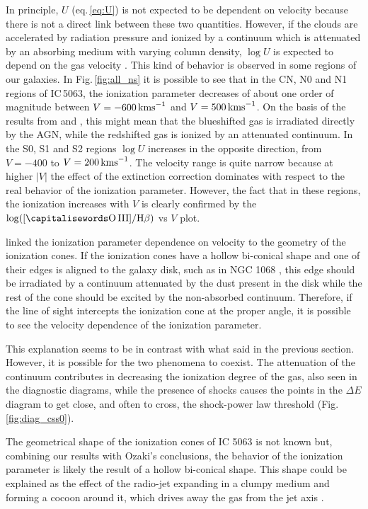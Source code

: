 \documentclass[../main.tex]{subfiles}
\begin{document}
In principle, $U$ (eq.\,\ref{eq:U}) is not expected to be dependent on velocity because there is not a direct link between these two quantities.
However, if the clouds are accelerated by radiation pressure and ionized by a continuum which is attenuated by an absorbing medium with varying column density, $\log U$ is expected to depend on the gas velocity \citep{Ozaki09}.
This kind of behavior is observed in some regions of our galaxies.
In Fig.\,\ref{fig:all_ns} it is possible to see that in the CN, N0 and N1 regions of IC\,5063, the ionization parameter decreases of about one order of magnitude between $V=-600\,\si{\kms}$ and $V=500\,\si{\kms}$.
On the basis of the results from \citet{Kraemer00} and \citet{Ozaki09}, this might mean that the blueshifted gas is irradiated directly by the AGN, while the redshifted gas is ionized by an attenuated continuum.
In the S0, S1 and S2 regions $\log U$ increases in the opposite direction, from $V=-400$ to $V=200\,\si{\kms}$.
The velocity range is quite narrow because at higher $\lvert V \rvert$ the effect of the extinction correction dominates with respect to the real behavior of the ionization parameter.
However, the fact that in these regions, the ionization increases with $V$ is clearly confirmed by the $\log([\rm\ion{O}{III}]/\Hb)$ vs $V$ plot.

\citet{Ozaki09} linked  the ionization parameter dependence on velocity to the geometry of the ionization cones.
If the ionization cones have a hollow bi-conical shape and one of their edges is aligned to the galaxy disk, such as in NGC 1068 \citep{Cecil02, Das06}, this edge should be irradiated by a continuum attenuated by the dust present in the disk while the rest of the cone should be excited by the non-absorbed continuum.
Therefore, if the line of sight intercepts the ionization cone at the proper angle, it is possible to see the velocity dependence of the ionization parameter.

This explanation seems to be in contrast with what said in the previous section.
However, it is possible for the two phenomena to coexist. 
The attenuation of the continuum contributes in decreasing the ionization degree of the gas, also seen in the diagnostic diagrams, while the presence of shocks causes the points in the $\Delta E$ diagram to get close, and often to cross, the shock-power law threshold (Fig.\,\ref{fig:diag_css0}).

The geometrical shape of the ionization cones of IC 5063 is not known but, combining our results with Ozaki's conclusions, the behavior of the ionization parameter is likely the result of a hollow bi-conical shape. 
This shape could be explained as the effect of the radio-jet expanding in a clumpy medium and forming a cocoon around it, which drives away the gas from the jet axis \citep{Morganti15,Dasyra15} . 
\end{document}
